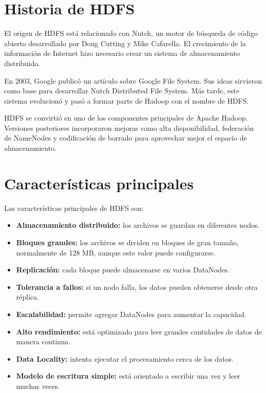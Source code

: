 \section{Historia de HDFS}

El origen de HDFS está relacionado con Nutch, un motor de búsqueda de código
abierto desarrollado por Doug Cutting y Mike Cafarella. El crecimiento de la
información de Internet hizo necesario crear un sistema de almacenamiento
distribuido.

En 2003, Google publicó un artículo sobre Google File System. Sus ideas
sirvieron como base para desarrollar Nutch Distributed File System. Más tarde,
este sistema evolucionó y pasó a formar parte de Hadoop con el nombre de HDFS.

HDFS se convirtió en uno de los componentes principales de Apache Hadoop.
Versiones posteriores incorporaron mejoras como alta disponibilidad,
federación de NameNodes y codificación de borrado para aprovechar mejor el
espacio de almacenamiento.

\section{Características principales}

Las características principales de HDFS son:

\begin{itemize}
    \item \textbf{Almacenamiento distribuido:} los archivos se guardan en
    diferentes nodos.

    \item \textbf{Bloques grandes:} los archivos se dividen en bloques de gran
    tamaño, normalmente de 128 MB, aunque este valor puede configurarse.

    \item \textbf{Replicación:} cada bloque puede almacenarse en varios
    DataNodes.

    \item \textbf{Tolerancia a fallos:} si un nodo falla, los datos pueden
    obtenerse desde otra réplica.

    \item \textbf{Escalabilidad:} permite agregar DataNodes para aumentar la
    capacidad.

    \item \textbf{Alto rendimiento:} está optimizado para leer grandes
    cantidades de datos de manera continua.

    \item \textbf{Data Locality:} intenta ejecutar el procesamiento cerca de
    los datos.

    \item \textbf{Modelo de escritura simple:} está orientado a escribir una
    vez y leer muchas veces.
\end{itemize}

